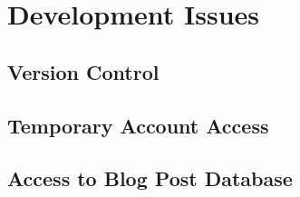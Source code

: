 \section{Development Issues}
\subsection{Version Control}
\subsection{Temporary Account Access}
\subsection{Access to Blog Post Database}
